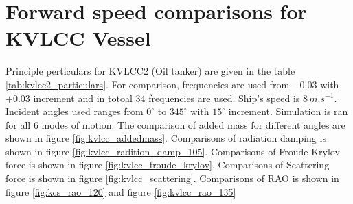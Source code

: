 \section{Forward speed comparisons for KVLCC Vessel}
Principle perticulars for KVLCC2 (Oil tanker) are given in the table \ref{tab:kvlcc2_particulars}.
For comparison, frequencies are used from
$-0.03$ with $+0.03$ increment and in totoal $34$ frequencies are used. Ship's speed is $8\,\si{m.s^{-1}}$. 
Incident angles used 
ranges from $0^{\circ}$ to $345^{\circ}$ with $15^{\circ}$ increment. Simulation is ran for all 6 modes of motion.  
The comparison of added mass for different angles are shown in figure \ref{fig:kvlcc_addedmass}.
Comparisons of radiation damping is shown in figure \ref{fig:kvlcc_radition_damp_105}. 
Comparisons of Froude Krylov force is shown in figure \ref{fig:kvlcc_froude_krylov}.
Comparisons of Scattering force is shown in figure \ref{fig:kvlcc_scattering}. 
Comparisons of RAO is shown in figure \ref{fig:kcs_rao_120}
and figure \ref{fig:kvlcc_rao_135}
\\[1.5cm]

\begin{table}[h]
    \caption{$\text{KVLCC2 principal particulars}$}
    \label{tab:kvlcc2_particulars}
\end{table}
